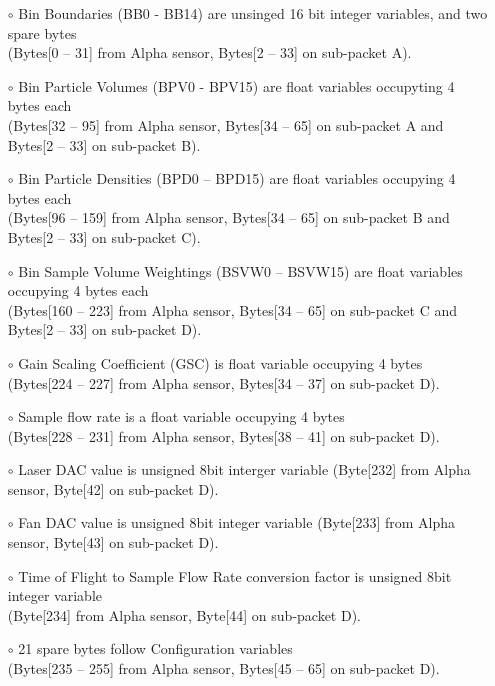 \begin{itemize}
\setlength\itemsep{0em}
\item[$\circ$] Bin Boundaries (BB0 - BB14) are unsinged 16 bit integer variables, and two spare bytes \\
(Bytes[0 -- 31] from Alpha sensor, Bytes[2 -- 33] on sub-packet A).
\item[$\circ$] Bin Particle Volumes (BPV0 - BPV15) are float variables occupyting 4 bytes each \\
(Bytes[32 -- 95] from Alpha sensor, Bytes[34 -- 65] on sub-packet A and Bytes[2 -- 33] on sub-packet B).
\item[$\circ$] Bin Particle Densities (BPD0 -- BPD15) are float variables occupying 4 bytes each \\
(Bytes[96 -- 159] from Alpha sensor, Bytes[34 -- 65] on sub-packet B and Bytes[2 -- 33] on sub-packet C).
\item[$\circ$] Bin Sample Volume Weightings (BSVW0 -- BSVW15) are float variables occupying 4 bytes each \\
(Bytes[160 -- 223] from Alpha sensor, Bytes[34 -- 65] on sub-packet C and Bytes[2 -- 33] on sub-packet D).
\item[$\circ$] Gain Scaling Coefficient (GSC) is float variable occupying 4 bytes \\
(Bytes[224 -- 227] from Alpha sensor, Bytes[34 -- 37] on sub-packet D).
\item[$\circ$] Sample flow rate is a float variable occupying 4 bytes \\
(Bytes[228 -- 231] from Alpha sensor, Bytes[38 -- 41] on sub-packet D).
\item[$\circ$] Laser DAC value is unsigned 8bit interger variable
(Byte[232] from Alpha sensor, Byte[42] on sub-packet D).
\item[$\circ$] Fan DAC value is unsigned 8bit integer variable
(Byte[233] from Alpha sensor, Byte[43] on sub-packet D).
\item[$\circ$] Time of Flight to Sample Flow Rate conversion factor is unsigned 8bit integer variable \\
(Byte[234] from Alpha sensor, Byte[44] on sub-packet D).
\item[$\circ$] 21 spare bytes follow Configuration variables \\
(Bytes[235 -- 255] from Alpha sensor, Bytes[45 -- 65] on sub-packet D).
\end{itemize}


\makeatletter
\setlength{\@fptop}{0pt}
\makeatother


